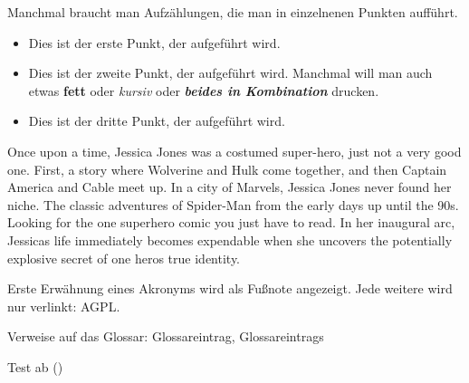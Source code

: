 Manchmal braucht man Aufzählungen, die man in einzelnenen Punkten aufführt.
\begin{itemize}
\item Dies ist der erste Punkt, der aufgeführt wird.
\item Dies ist der zweite Punkt, der aufgeführt wird. Manchmal will man auch etwas \textbf{fett} oder \textit{kursiv} oder \textbf{\textit{beides in Kombination}}  drucken.
\item Dies ist der dritte Punkt, der aufgeführt wird.
\end{itemize}

Once upon a time, Jessica Jones was a costumed super-hero, just not a very good one. First, a story where Wolverine and Hulk come together, and then Captain America and Cable meet up. In a city of Marvels, Jessica Jones never found her niche. The classic adventures of Spider-Man from the early days up until the 90s. Looking for the one superhero comic you just have to read. In her inaugural arc, Jessicas life immediately becomes expendable when she uncovers the potentially explosive secret of one heros true identity.

Erste Erwähnung eines Akronyms wird als Fußnote angezeigt. Jede weitere wird
nur verlinkt: \acf{AGPL}. \cite{fsf:2007}

Verweise auf das Glossar: \gls{Glossareintrag}, \glspl{Glossareintrag}


Test ab (\cite[S. 2]{AttributingResponsibilityBig2024})

